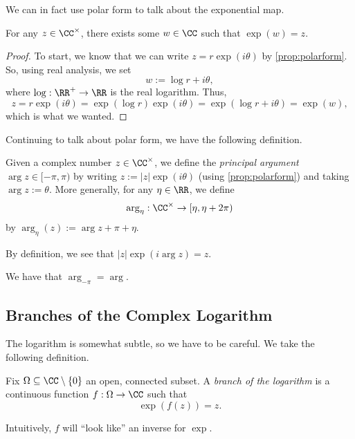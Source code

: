 We can in fact use polar form to talk about the exponential map.
\begin{corollary} \label{cor:expsurj}
	For any $z\in\CC^\times$, there exists some $w\in\CC$ such that $\exp(w)=z$.
\end{corollary}
\begin{proof}
	To start, we know that we can write $z=r\exp(i\theta)$ by \autoref{prop:polarform}. So, using real analysis, we set
	\[w:=\log r+i\theta,\]
	where $\log:\RR^+\to\RR$ is the real logarithm. Thus,
	\[z=r\exp(i\theta)=\exp(\log r)\exp(i\theta)=\exp(\log r+i\theta)=\exp(w),\]
	which is what we wanted.
\end{proof}
Continuing to talk about polar form, we have the following definition.
\begin{definition}[Argument]
	Given a complex number $z\in\CC^\times$, we define the \textit{principal argument} $\arg z\in[-\pi,\pi)$ by writing $z:=|z|\exp(i\theta)$ (using \autoref{prop:polarform}) and taking $\arg z:=\theta$. More generally, for any $\eta\in\RR$, we define
	\[\arg_\eta:\CC^\times\to[\eta,\eta+2\pi)\]
	by $\arg_\eta(z):=\arg z+\pi+\eta$.
\end{definition}
\begin{remark}[Nir] \label{rem:unwindingarg}
	By definition, we see that $|z|\exp(i\arg z)=z$.
\end{remark}
\begin{example}
	We have that $\arg_{-\pi}=\arg$.
\end{example}

\subsection{Branches of the Complex Logarithm}
The logarithm is somewhat subtle, so we have to be careful. We take the following definition.
\begin{definition}
	Fix $\Omega\subseteq\CC\setminus\{0\}$ an open, connected subset. A \textit{branch of the logarithm} is a continuous function $f:\Omega\to\CC$ such that
	\[\exp(f(z))=z.\] 
\end{definition}
Intuitively, $f$ will ``look like'' an inverse for $\exp$.

